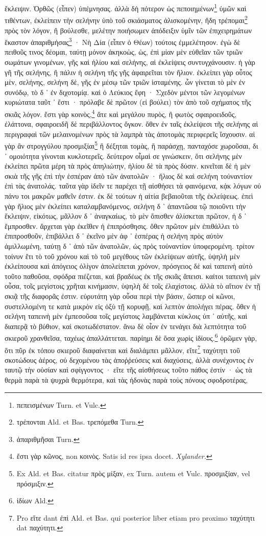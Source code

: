 \documentclass[a4paper, 11pt, oneside, polutonikogreek, german]{article}
\begin{document}
ἔκλειψιν. Ὀρθῶς (εἶπεν) ὑπέμνησας. ἀλλὰ δὴ πότερον ὡς πεποιημένων\footnote{πεπεισμένων Turn. et Vulc.} ὑμῶν καὶ τιθέντων, ἐκλείπειν τὴν σελήνην ὑπὸ τοῦ σκιάσματος ἁλισκομένην, ἤδη τρέπομαι\footnote{τρέπονται Ald. et Bas. τρεπόμεθα Turn.} πρὸς τὸν λόγον, ἢ βούλεσθε, μελέτην ποιήσωμεν ἀπόδειξιν ὑμῖν τῶν ἐπιχειρημάτων ἕκαστον ἀπαριθμήσας\footnote{ἀπαριθμῆσαι Turn.} · Νὴ Δία (εἶπεν ὁ Θέων) τούτοις ἐμμελέτησον. ἐγὼ δὲ πειθοῦς τινος δέομαι, ταύτῃ μόνον ἀκηκοὼς, ὡς, ἐπὶ μίαν μὲν εὐθεῖαν τῶν τριῶν σωμάτων γινομένων, γῆς καὶ ἡλίου καὶ σελήνης, αἱ ἐκλείψεις συντυγχάνουσιν. ἡ γὰρ γῆ τῆς σελήνης, ἢ πάλιν ἡ σελήνη τῆς γῆς ἀφαιρεῖται τὸν ἥλιον. ἐκλείπει γὰρ οὗτος μὲν, σελήνης, σελήνη δὲ, γῆς ἐν μέσῳ τῶν τριῶν ἱσταμένης. ὧν γίνεται τὸ μὲν ἐν συνόδῳ, τὸ δ ᾽ ἐν διχοτομίᾳ. καὶ ὁ Λεύκιος ἔφη · Σχεδὸν μέντοι τῶν λεγομένων κυριώτατα ταῦτ ᾽ ἔστι · πρόλαβε δὲ πρῶτον (εἰ βούλει) τὸν ἀπὸ τοῦ σχήματος τῆς σκιᾶς λόγον. ἔστι γὰρ κοινὸς,\footnote{ἔστι γὰρ κῶνος, non κοινὸς. Satis id res ipsa docet. \emph{Xylander.}} ἅτε καὶ μεγάλου πυρὸς, ἢ φωτὸς σφαιροειδοῦς, ἐλάττονα, σφαιροειδῆ δὲ περιβάλλοντος ὄγκον. ὅθεν ἐν ταῖς ἐκλείψεσι τῆς σελήνης αἱ περιγραφαὶ τῶν μελαινομένων πρὸς τὰ λαμπρὰ τὰς ἀποτομὰς περιφερεῖς ἴσχουσιν. αἱ γὰρ ἂν στρογγύλου προσμιξίαι\footnote{Ex Ald. et Bas. citatur πρὸς μίξαν, ex Turn. autem et Vulc. προσμιξίαν, vel πρόσμιξιν.} ἢ δέξηται τομὰς, ἢ παράσχῃ, πανταχόσε χωροῦσαι, δι ᾽ ομοιότητα γίνονται κυκλοτερεῖς. δεύτερον οἶμαὶ σε γινώσκειν, ὅτι σελήνης μὲν ἐκλείπει πρῶτα μέρη τὰ πρὸς ἀπηλιώτην, ἡλίου δὲ τὰ πρὸς δύσιν. κινεῖται δὲ ἡ μὲν σκιὰ τῆς γῆς ἐπὶ τὴν ἑσπέραν ἀπὸ τῶν ἀνατολῶν · ἥλιος δὲ καὶ σελήνη τοὐναντίον ἐπὶ τὰς ἀνατολάς. ταῦτα γὰρ ἰδεῖν τε παρέχει τῇ αἰσθήσει τὰ φαινόμενα, κᾀκ λόγων οὐ πάνυ τοι μακρῶν μαθεῖν ἐστιν. ἐκ δὲ τούτων ἡ αἰτία βεβαιοῦται τῆς ἐκλείψεως. ἐπεὶ γὰρ ἥλιος μὲν ἐκλείπει καταλαμβανόμενος, σελήνη δ ᾽ ἀπαντῶσα τῷ ποιοῦντι τὴν ἔκλειψιν, εἰκότως, μᾶλλον δ ᾽ ἀναγκαίως, τὸ μὲν ὄπισθεν ἁλίσκεται πρῶτον, ἡ δ ᾽ ἔμπροσθεν. ἄρχεται γὰρ ἐκεῖθεν ἡ ἐπιπρόσθησις. ὅθεν πρῶτον μὲν ἐπιθάλλει τὸ ἐπιπροσθοῦν, ἐπιβάλλει δ ᾽ ἐκεῖνο μὲν ἀφ ᾽ ἑσπέρας ἡ σελήνη πρὸς αὐτὸν ἁμιλλωμένη, ταύτῃ δ ᾽ ἀπὸ τῶν ἀνατολῶν, ὡς πρὸς τοὐναντίον ὑποφερομένη. τρίτον τοίνυν ἔτι τὸ τοῦ χρόνου καὶ τὸ τοῦ μεγέθους τῶν ἐκλείψεων αὐτῆς, ὑψηλὴ μὲν ἐκλείπουσα καὶ ἀπόγειος ὀλίγον ἀπολείπεται χρόνον, πρόσγειος δὲ καὶ ταπεινὴ αὐτὸ τοῦτο παθοῦσα, σφόδρα πιέζεται, καὶ βραδέως ἐκ τῆς σκιᾶς ἄπεισι. καίτοι ταπεινὴ μὲν οὖσα, τοῖς μεγίστοις χρῆται κινήμασιν, ὑψηλὴ δὲ τοῖς ἐλαχίστοις. ἀλλὰ τὸ αἴτιον ἐν τῇ σκιᾷ τῆς διαφορᾶς ἐστιν. εὐρυτάτη γὰρ οὖσα περὶ τὴν βάσιν, ὥσπερ οἱ κῶνοι, συστελλομένη τε κατὰ μικρὸν εἰς ὀξὺ τῇ κορυφῇ, καὶ λεπτὸν ἀπολήγει πέρας. ὅθεν ἡ σελήνη ταπεινὴ μὲν ἐμπεσοῦσα τοῖς μεγίστοις λαμβάνεται κύκλοις ὑπ ᾽ αὐτῆς, καὶ διαπερᾷ τὸ βύθιον, καὶ σκοτωδέστατον. ἄνω δὲ οἷον ἐν τενάγει διὰ λεπτότητα τοῦ σκιεροῦ χρανθεῖσα, ταχέως ἀπαλλάττεται. παρίημι δὲ ὅσα χωρὶς ἰδίους.\footnote{ἰδίων Ald.} ὁρῶμεν γὰρ, ὅτι πῦρ ἐκ τόπου σκιεροῦ διαφαίνεται καὶ διαλάμπει μᾶλλον, εἴτε\footnote{Pro εἴτε dant ἐπὶ Ald. et Bas. qui posterior liber etiam pro proximo ταχύτητι dat παχύτητι.} ταχύτητι τοῦ σκοτώδους ἀέρος, οὐ δεχομένου τὰς ἀποῤῥεύσεις καὶ διαχύσεις, ἀλλὰ συνέχοντος ἐν ταυτῷ τὴν οὐσίαν καὶ σφίγγοντος · εἴτε τῆς αἰσθήσεως τοῦτο πάθος ἐστίν · ὡς τὰ θερμὰ παρὰ τὰ ψυχρὰ θερμότερα, καὶ τὰς ἡδονὰς παρὰ τοὺς πόνους σφοδροτέρας, 
\end{document}

